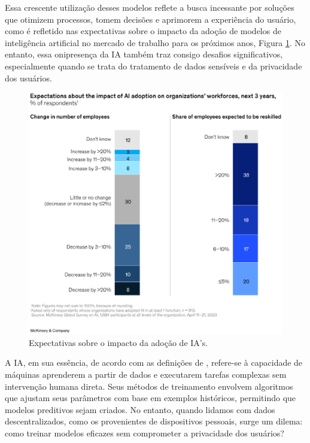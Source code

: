 Essa crescente utilização desses modelos reflete a busca incessante por soluções que otimizem processos, tomem decisões e aprimorem a experiência do usuário, como é refletido nas expectativas sobre o impacto da adoção de modelos de inteligência artificial no mercado de trabalho para os próximos anos, Figura \ref{fig:capacidadeIA}. No entanto, essa onipresença da IA também traz consigo desafios significativos, especialmente quando se trata do tratamento de dados sensíveis e da privacidade dos usuários.

\begin{figure}[h]
    \centering
    \includegraphics[scale = 0.8]{figuras/introducao/ExpectationsAboutImpact.eps}
    \caption{Expectativas sobre o impacto da adoção de IA's.}
    \label{fig:capacidadeIA}
\end{figure}

A IA, em sua essência, de acordo com as definições de \cite{russel}, refere-se à capacidade de máquinas aprenderem a partir de dados e executarem tarefas complexas sem intervenção humana direta. Seus métodos de treinamento envolvem algoritmos que ajustam seus parâmetros com base em exemplos históricos, permitindo que modelos preditivos sejam criados. No entanto, quando lidamos com dados descentralizados, como os provenientes de dispositivos pessoais, surge um dilema: como treinar modelos eficazes sem comprometer a privacidade dos usuários?


